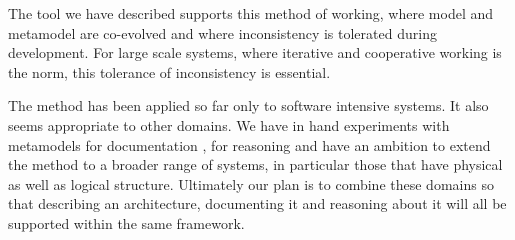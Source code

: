 \documentclass[times, 10pt,twocolumn]{article}
\begin{document}
The tool we have described supports this method of working, where model and metamodel are co-evolved and where inconsistency is tolerated during development. For large scale systems, where iterative and cooperative working is the norm, this tolerance of inconsistency is essential.

The method has been applied so far only to software intensive systems. It also seems appropriate to other domains. We have in hand experiments with metamodels for documentation \cite{Henderson3}, for reasoning \cite{Rushby,Haley05arguingsecurity} and have an ambition to extend the method to a broader range of systems, in particular those that have physical as well as logical structure. Ultimately our plan is to combine these domains so that describing an architecture, documenting it and reasoning about it will all be supported within the same framework.




\end{document}
